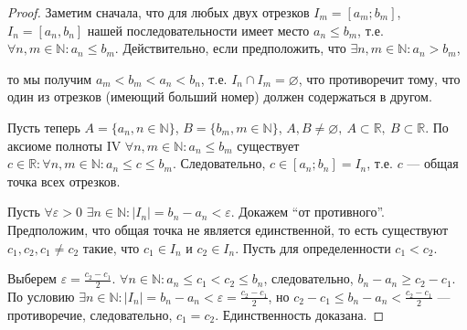 \documentclass[a4paper,12pt]{article} %
\theoremstyle{remark}
\theoremstyle{definition}
\begin{document}
\begin{proof}
	Заметим сначала, что для любых двух отрезков $I_m = [a_m; b_m]$,  $I_n = [a_n, b_n]$ нашей последовательности 
    имеет место $a_n \le b_m$, т.е. $\forall n, m \in  \mathbb{N} : a_n \le b_m$. 
    Действительно, если предположить, что $\exists n, m \in  \mathbb{N} : a_n > b_m$,
\begin{center}
\end{center}
    то мы получим $a_m < b_m < a_n < b_n$, т.е. $I_n \cap I_m = \varnothing$, что противоречит тому, что один из отрезков
    (имеющий больший номер) должен содержаться в другом.

    Пусть теперь $A = \{a_n, n \in  \mathbb{N}\}$, $B = \{b_m, m \in \mathbb{N}\}$, $A, B \neq \varnothing,
    \ A \subset \mathbb{R}, \ B \subset \mathbb{R}$.
    По аксиоме полноты IV $\forall n, m \in \mathbb{N} : a_n \le b_m$ существует $c\in \mathbb{R} 
    : \forall n, m \in  \mathbb{N} : a_n \le  c \le  b_m$.
    Следовательно, $c\in [a_n; b_n] = I_n$, т.е. $c$ --- общая точка всех отрезков.

    Пусть $\forall \varepsilon > 0$ $\exists n \in  \mathbb{N} : |I_n| = b_n-a_n < \varepsilon$.
    Докажем ``от противного''. Предположим, что общая точка не является единственной,
    то есть существуют $c_1, c_2, c_1\neq c_2$ такие, что $c_1 \in  I_n$ и $c_2 \in  I_n$. Пусть для определенности $c_1<c_2$.

\begin{center}
\end{center}

Выберем $\displaystyle \varepsilon = \frac{c_2-c_1}{2}$. $\forall n\in \mathbb{N} : a_n \le  c_1 < c_2 \le b_n$,
следовательно, $b_n - a_n \ge c_2-c_1$. По условию $\displaystyle \exists n \in  \mathbb{N} : |I_n| = b_n - a_n < \varepsilon 
= \frac{c_2-c_1}{2}$, но $\displaystyle c_2-c_1 \le b_n  - a_n < \frac{c_2-c_1}{2}$ --- противоречие, следовательно,
$c_1=c_2$. Единственность доказана.
\end{proof}
\end{document}
